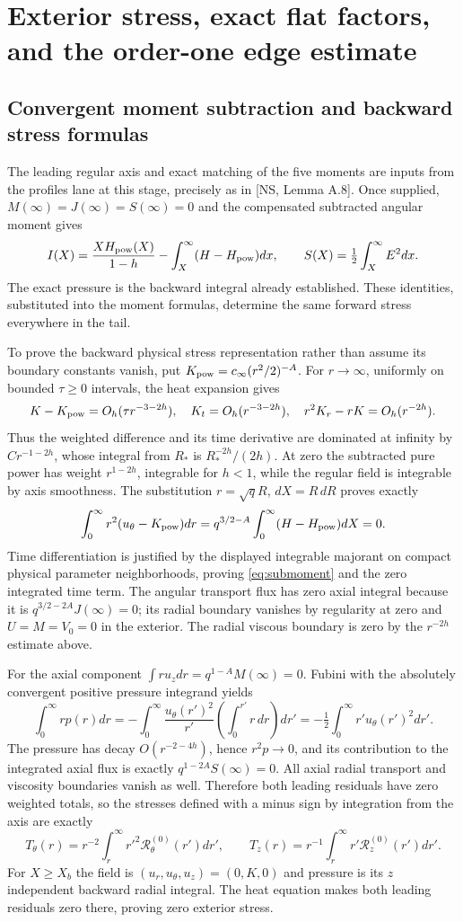 \documentclass[10pt,a4paper]{article}
\newcommand{\res}{\mathcal R}
\begin{document}
\section{Exterior stress, exact flat factors, and the order-one edge estimate}
\subsection{Convergent moment subtraction and backward stress formulas}
The leading regular axis and exact matching of the five moments are inputs
from the profiles lane at this stage, precisely as in [NS, Lemma A.8].
Once supplied, $M(\infty)=J(\infty)=S(\infty)=0$ and the compensated
subtracted angular moment gives
\[
I(X)=\frac{XH_{\rm pow}(X)}{1-h}-\int_X^\infty(H-H_{\rm pow})dx,
\qquad S(X)=\tfrac12\int_X^\infty E^2dx.
\]
The exact pressure is the backward integral already established. These
identities, substituted into the moment formulas, determine the same forward
stress everywhere in the tail.

To prove the backward physical stress representation rather than assume its
boundary constants vanish, put $K_{\rm pow}=c_\infty(r^2/2)^{-A}$.
For $r\to\infty$, uniformly on bounded $\tau\ge0$ intervals, the heat
expansion gives
\[
K-K_{\rm pow}=O_h(\tau r^{-3-2h}),\quad K_t=O_h(r^{-3-2h}),
\quad r^2K_r-rK=O_h(r^{-2h}).
\]
Thus the weighted difference and its time derivative are dominated at infinity
by $Cr^{-1-2h}$, whose integral from $R_*$ is $R_*^{-2h}/(2h)$.
At zero the subtracted pure power has weight $r^{1-2h}$, integrable for
$h<1$, while the regular field is integrable by axis smoothness.
The substitution $r=\sqrt qR$, $dX=R\,dR$ proves exactly
\[
\int_0^\infty r^2(u_\theta-K_{\rm pow})dr
=q^{3/2-A}\int_0^\infty(H-H_{\rm pow})dX=0.
\]
Time differentiation is justified by the displayed integrable majorant on
compact physical parameter neighborhoods, proving \eqref{eq:submoment} and
the zero integrated time term.
The angular transport flux has zero axial integral because it is
$q^{3/2-2A}J(\infty)=0$; its radial boundary vanishes by regularity at
zero and $U=M=V_0=0$ in the exterior. The radial viscous boundary is zero
by the $r^{-2h}$ estimate above.

For the axial component $\int ru_zdr=q^{1-A}M(\infty)=0$.
Fubini with the absolutely convergent positive pressure integrand yields
\[
\int_0^\infty rp(r)dr
=-\int_0^\infty\frac{u_\theta(r')^2}{r'}
\left(\int_0^{r'}r\,dr\right)dr'
=-\tfrac12\int_0^\infty r'u_\theta(r')^2dr'.
\]
The pressure has decay $O(r^{-2-4h})$, hence $r^2p\to0$, and its contribution
to the integrated axial flux is exactly $q^{1-2A}S(\infty)=0$.
All axial radial transport and viscosity boundaries vanish as well.
Therefore both leading residuals have zero weighted totals, so the stresses
defined with a minus sign by integration from the axis are exactly
\begin{equation}\label{eq:backward}
T_\theta(r)=r^{-2}\int_r^\infty r'^2\res_\theta^{(0)}(r')dr',\qquad
T_z(r)=r^{-1}\int_r^\infty r'\res_z^{(0)}(r')dr'.
\end{equation}
For $X\ge X_b$ the field is $(u_r,u_\theta,u_z)=(0,K,0)$ and pressure
is its $z$ independent backward radial integral. The heat equation makes both
leading residuals zero there, proving zero exterior stress.
\end{document}
